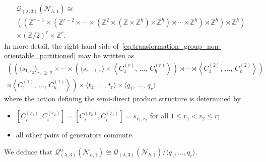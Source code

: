 \documentclass[AHL,Unicode,published]{cedram}
\newcommand{\unt}{\mathrm{u}}
\newcommand{\N}{\mathscr{N}}
\newcommand{\cQ}{\mathcal{Q}}
\newcommand{\bZ}{\mathbb{Z}}
\renewcommand{\geq}{\geqslant}
\renewcommand{\leq}{\leqslant}
\begin{document}
\begin{prop}
\begin{multline}
\cQ_{(\lambda,3)}(\N_{h,1}) \cong \\ \left(\left(\bZ^{r-1}\times\left(\bZ^{r-2}\times\cdots\times\left(\bZ^{2}\times\left(\bZ\times\bZ^{h}\right)\rtimes \bZ^{h}\right) \rtimes\cdots\rtimes\bZ^{h}\right)\rtimes\bZ^{h}\right)\rtimes\bZ^{h} \right) \\\times(\bZ/2)^{r}\times\bZ^{r}.
\end{multline}
In more detail, the right-hand side of~\eqref{eq:transformation_group_non-orientable_partitioned} may be written as
\begin{multline*}
\left(\left(\langle s_{1,r_{2}}\rangle_{r_{2}\,\geq\,2} \times\cdots\times \left(\langle s_{r-1,r}\rangle\times\left\langle C_{1}^{(r)},\,\ldots,\,C_{h}^{(r)}\right\rangle \right) \rtimes \cdots \rtimes \left\langle C_{1}^{(2)},\,\ldots,\,C_{h}^{(2)}\right\rangle \right) \right. \\
\left. \rtimes \left\langle C_{1}^{(1)},\,\ldots,\,C_{h}^{(1)}\right\rangle \right) \times \langle t_{1},\,\ldots,\,t_{r}\rangle\times \langle q_{1},\,\ldots,\,q_{r}\rangle
\end{multline*}
where the action defining the semi-direct product structure is determined by
\begin{itemize}
\item $[C_{i}^{(r_{1})},C_{i}^{(r_{2})}]= [C_{i}^{(r_{2})},C_{i}^{(r_{1})}]= s_{r_{1},r_{2}}$ for all $1\leq r_{1}< r_{2}\leq r$;
\item all other pairs of generators commute.
\end{itemize}
We deduce that $\cQ_{(\lambda,3)}^{\unt}(\N_{h,1})\cong\cQ_{(\lambda,3)}(\N_{h,1})/\langle q_{1},\ldots,q_{r}\rangle$.
\end{prop}
\end{document}
